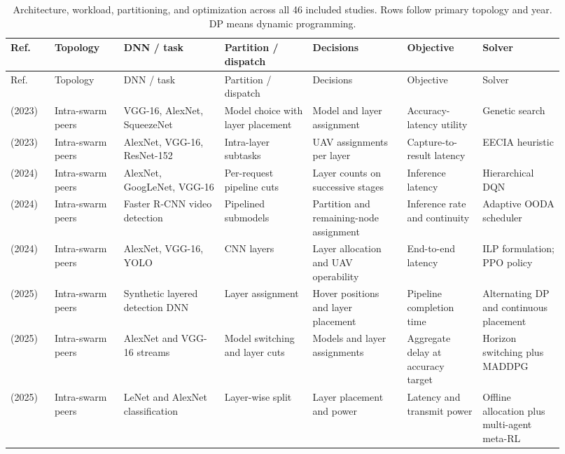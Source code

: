\begingroup\fontsize{8}{10}\selectfont\setlength{\tabcolsep}{2.5pt}\renewcommand{\arraystretch}{1.17}
\begin{longtable}{@{}Y{0.075\linewidth}Y{0.111\linewidth}Y{0.169\linewidth}Y{0.145\linewidth}Y{0.151\linewidth}Y{0.125\linewidth}Y{0.139\linewidth}@{}}
\caption{Architecture, workload, partitioning, and optimization across all 46 included studies. Rows follow primary topology and year. DP means dynamic programming.}\label{tab:architecture} \\
\toprule
Ref. & Topology & DNN / task & Partition / dispatch & Decisions & Objective & Solver \\
\midrule
\endfirsthead
\toprule
Ref. & Topology & DNN / task & Partition / dispatch & Decisions & Objective & Solver \\
\midrule
\endhead
\midrule
\endfoot
\bottomrule
\endlastfoot
\cite{R0003} (2023) & Intra-swarm peers & VGG-16, AlexNet, SqueezeNet & Model choice with layer placement & Model and layer assignment & Accuracy-latency utility & Genetic search \\
\cite{R0015} (2023) & Intra-swarm peers & AlexNet, VGG-16, ResNet-152 & Intra-layer subtasks & UAV assignments per layer & Capture-to-result latency & EECIA heuristic \\
\cite{R0010} (2024) & Intra-swarm peers & AlexNet, GoogLeNet, VGG-16 & Per-request pipeline cuts & Layer counts on successive stages & Inference latency & Hierarchical DQN \\
\cite{R0062} (2024) & Intra-swarm peers & Faster R-CNN video detection & Pipelined submodels & Partition and remaining-node assignment & Inference rate and continuity & Adaptive OODA scheduler \\
\cite{R0073} (2024) & Intra-swarm peers & AlexNet, VGG-16, YOLO & CNN layers & Layer allocation and UAV operability & End-to-end latency & ILP formulation; PPO policy \\
\cite{R0006} (2025) & Intra-swarm peers & Synthetic layered detection DNN & Layer assignment & Hover positions and layer placement & Pipeline completion time & Alternating DP and continuous placement \\
\cite{R0059} (2025) & Intra-swarm peers & AlexNet and VGG-16 streams & Model switching and layer cuts & Models and layer assignments & Aggregate delay at accuracy target & Horizon switching plus MADDPG \\
\cite{R0068} (2025) & Intra-swarm peers & LeNet and AlexNet classification & Layer-wise split & Layer placement and power & Latency and transmit power & Offline allocation plus multi-agent meta-RL \\

\end{longtable}

